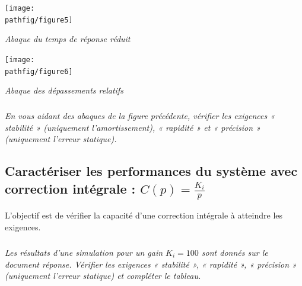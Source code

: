 \documentclass[10pt,fleqn]{article} %
\begin{document}
\begin{minipage}[c]{.47\linewidth}
\begin{center}
\texttt{[image: \\pathfig/figure5]}

\textit{Abaque du temps de réponse réduit}
\end{center}
\end{minipage} \hfill
\begin{minipage}[c]{.47\linewidth}
\begin{center}
\texttt{[image: \\pathfig/figure6]}

\textit{Abaque des dépassements relatifs}
\end{center}
\end{minipage}




\subparagraph{}\textit{En vous aidant des abaques de la figure précédente, vérifier les exigences « stabilité »
(uniquement l'amortissement), « rapidité » et « précision » (uniquement l'erreur statique).}


\subsection{Caractériser les performances du système avec
correction intégrale : $C(p)=\frac{K_i}{p}$\\}


L'objectif est de vérifier la capacité d'une correction intégrale à atteindre les exigences.


\subparagraph{}\textit{Les résultats d'une simulation pour un gain $K_i = 100$ sont donnés sur le document réponse. Vérifier les exigences « stabilité », « rapidité », « précision » (uniquement l'erreur statique)
et compléter le tableau.}
\end{document}
